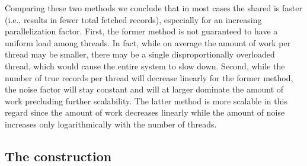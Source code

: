 			Comparing these two methods we conclude that in most cases the shared \serverDS{} is faster (i.e., results in fewer total fetched records), especially for an increasing parallelization factor.
			First, the former method is not guaranteed to have a uniform load among threads.
			In fact, while on average the amount of work per thread may be smaller, there may be a single disproportionally overloaded thread, which would cause the entire system to slow down.
			Second, while the number of true records per thread will decrease linearly for the former method, the noise factor will stay constant and will at larger \oramsNumber{} dominate the amount of work precluding further scalability.
			The latter method is more scalable in this regard since the amount of work decreases linearly while the amount of noise increases only logarithmically with the number of threads.

		\subsection{The construction}

